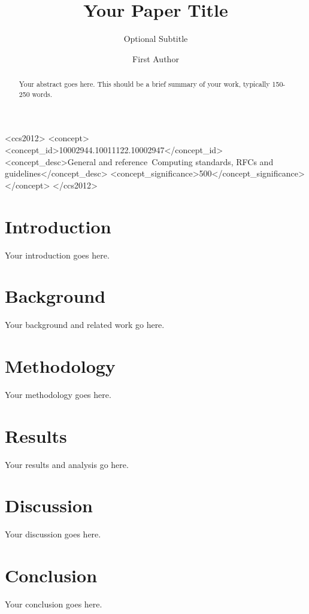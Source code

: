 \documentclass[sigconf,review]{acmart}
\begin{document}
\title{Your Paper Title}
\subtitle{Optional Subtitle}

\author{First Author}

\begin{abstract}
Your abstract goes here. This should be a brief summary of your work, typically 150-250 words.
\end{abstract}

\begin{CCSXML}
<ccs2012>
<concept>
<concept_id>10002944.10011122.10002947</concept_id>
<concept_desc>General and reference~Computing standards, RFCs and guidelines</concept_desc>
<concept_significance>500</concept_significance>
</concept>
</ccs2012>
\end{CCSXML}



\maketitle

\section{Introduction}
Your introduction goes here.

\section{Background}
Your background and related work go here.

\section{Methodology}
Your methodology goes here.

\section{Results}
Your results and analysis go here.

\section{Discussion}
Your discussion goes here.

\section{Conclusion}
Your conclusion goes here.



\end{document}
